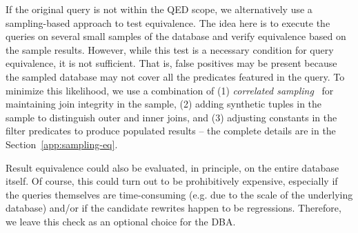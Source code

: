 %
If the original query is not within the QED scope, we alternatively use a sampling-based approach to test equivalence. The idea here is to execute the queries on several small samples of the database and verify equivalence based on the sample results. 
%
However, while this test is a necessary condition for query equivalence, it is not sufficient. That is,  false positives may be present because the sampled database may not cover all the predicates featured in the query. To minimize this likelihood, we use a combination of (1) \textit{correlated sampling}~\cite{cs2} for maintaining join integrity in the sample, (2) adding synthetic tuples in the sample to distinguish outer and inner joins, and (3) adjusting constants in the filter predicates to produce populated results -- the complete details are in the Section~\ref{app:sampling-eq}. 

%
Result equivalence could also be evaluated, in principle, on the entire database itself. Of course, this could turn out to be prohibitively expensive, especially if the queries themselves are time-consuming (e.g. due to the scale of the underlying database) and/or if the candidate rewrites happen to be regressions. Therefore, we leave this check as an optional choice for the DBA.
